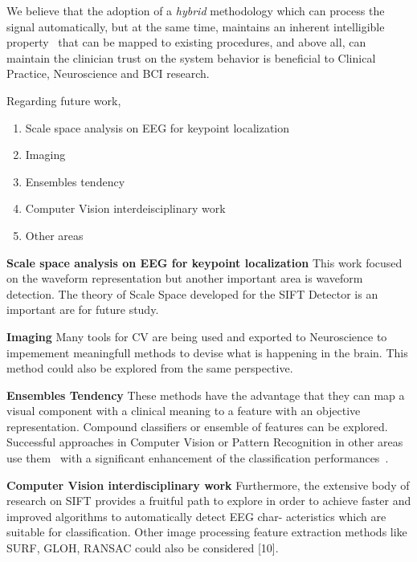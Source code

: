 We believe that the adoption of a \textit{hybrid} methodology which can process the signal automatically, but at the same time, maintains an inherent intelligible property~\cite{j2018challenge} that can be mapped to existing procedures, and above all, can maintain the clinician trust on the system behavior is beneficial to Clinical Practice, Neuroscience and BCI research. 



Regarding future work, 

\begin{enumerate}
\item Scale space analysis on EEG for keypoint localization
\item Imaging
\item Ensembles tendency
\item Computer Vision interdeisciplinary work
\item Other areas
\end{enumerate}

\textbf{Scale space analysis on EEG for keypoint localization}
This work focused on the waveform representation but another important area is waveform detection.  The theory of Scale Space developed for the SIFT Detector is an important are for future study.

\textbf{Imaging}
Many tools for CV are being used and exported to Neuroscience to impemement meaningfull methods to devise what is happening in the brain.  This method could also be explored from the same perspective.


\textbf{Ensembles Tendency}
These methods have the advantage that they can map a visual component with a clinical meaning to a feature with an objective representation. Compound classifiers or ensemble of features can be explored.  Successful approaches in Computer Vision or Pattern Recognition in other areas use them~\cite{Criminisi2013} with a significant enhancement of the classification performances~\cite{Gu2012}.


\textbf{Computer Vision interdisciplinary work}
Furthermore, the extensive body of research on SIFT provides a fruitful path to explore in order to achieve faster and improved algorithms to automatically detect EEG char- acteristics which are suitable for classification. Other image processing feature extraction methods like SURF, GLOH, RANSAC could also be considered [10].

